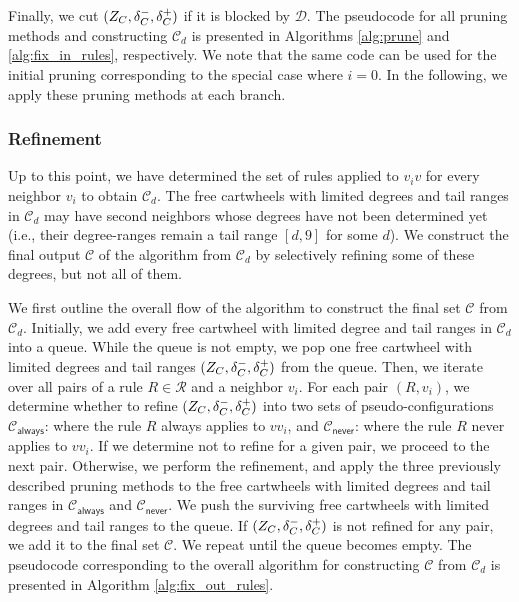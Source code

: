\documentclass[10pt,a4paper]{article}
\begin{document}
Finally, we cut $(Z_C, \delta_C^-, \delta_C^+)$ if it is blocked by $\mathcal{D}$.
The pseudocode for all pruning methods and constructing $\mathcal{C}_d$ is presented in Algorithms \ref{alg:prune} and \ref{alg:fix_in_rules}, respectively. We note that the same code can be used for the initial pruning corresponding to the special case where $i=0$.
In the following, we apply these pruning methods at each branch.

\subsubsection{Refinement}
\label{subsub:refinement}
\newcommand{\cCalways}{\mathcal{C}_{\textsf{always}}\xspace}
\newcommand{\cCnever}{\mathcal{C}_{\textsf{never}}\xspace}
Up to this point, we have determined the set of rules applied to $v_iv$ for every neighbor $v_i$ to obtain $\mathcal{C}_d$.
The free cartwheels with limited degrees and tail ranges in $\mathcal{C}_d$ may have second neighbors whose degrees have not been determined yet (i.e., their degree-ranges remain a tail range $[d, 9]$ for some $d$).
We construct the final output $\mathcal{C}$ of the algorithm from $\mathcal{C}_d$ by selectively refining some of these degrees, but not all of them.

We first outline the overall flow of the algorithm to construct the final set $\mathcal{C}$ from $\mathcal{C}_d$.
Initially, we add every free cartwheel with limited degree and tail ranges in $\mathcal{C}_d$ into a queue.
While the queue is not empty, we pop one free cartwheel with limited degrees and tail ranges $(Z_C, \delta_C^-, \delta_C^+)$ from the queue.
Then, we iterate over all pairs of a rule $R \in \mathcal{R}$ and a neighbor $v_i$.
For each pair $(R, v_i)$, we determine whether to refine $(Z_C, \delta_C^-, \delta_C^+)$ into two sets of pseudo-configurations $\cCalways$: where the rule $R$ always applies to $vv_i$, and $\cCnever$: where the rule $R$ never applies to $vv_i$.
If we determine not to refine for a given pair, we proceed to the next pair.
Otherwise, we perform the refinement, and apply the three previously described pruning methods to the free cartwheels with limited degrees and tail ranges in $\cCalways$ and $\cCnever$.
We push the surviving free cartwheels with limited degrees and tail ranges to the queue.
If $(Z_C, \delta_C^-, \delta_C^+)$ is not refined for any pair, we add it to the final set $\mathcal{C}$.
We repeat until the queue becomes empty.
The pseudocode corresponding to the overall algorithm for constructing $\mathcal{C}$ from $\mathcal{C}_d$ is presented in Algorithm \ref{alg:fix_out_rules}.
\end{document}
